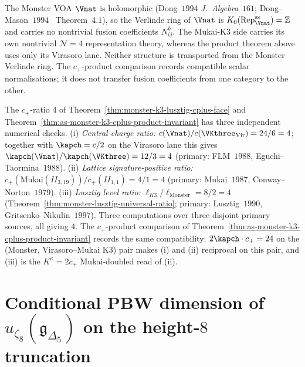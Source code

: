 \begin{remark}[Verlinde-style check: Monster fusion collapse forces
the Mukai $c_+ = 4$ side to carry the fusion content]
\label{rem:as-verlinde-monster-collapse}
%
%
The Monster VOA $\Vnat$ is holomorphic (Dong~$1994$
\emph{J.\ Algebra}~$161$; Dong--Mason~$1994$~\cite{DongMason94}
Theorem~$4.1$), so the Verlinde ring of $\Vnat$ is
$K_0(\mathrm{Rep}_{\Vnat}^{\mathrm{ss}}) = \mathbb Z$ and carries
no nontrivial fusion coefficients $N^k_{ij}$. The Mukai-K$3$ side
carries its own nontrivial $\mathcal N{=}4$ representation theory,
whereas the product theorem above uses only its Virasoro lane. Neither
structure is transported from the Monster Verlinde ring. The
$c_+$-product comparison records compatible scalar normalisations; it
does not transfer fusion coefficients from one category to the other.
\end{remark}

\begin{remark}
\label{rem:as-cplus-ratio-triverification}
%
The $c_+$-ratio $4$ of
Theorem~\ref{thm:monster-k3-lusztig-cplus-face} and
Theorem~\ref{thm:as-monster-k3-cplus-product-invariant} has three
independent numerical checks.
\textup{(i)} \emph{Central-charge ratio:}
$c(\Vnat)/c(\VKthree_{\mathrm{Vir}}) = 24/6 = 4$; together with
$\kapch = c/2$ on the Virasoro lane
this gives $\kapch(\Vnat)/\kapch(\VKthree) = 12/3 = 4$
(primary: FLM~$1988$, Eguchi--Taormina~$1988$).
\textup{(ii)} \emph{Lattice signature-positive ratio:}
$c_+(\mathrm{Mukai}(II_{3, 19}))/c_+(II_{1, 1}) = 4/1 = 4$
(primary: Mukai~$1987$, Conway--Norton~$1979$).
\textup{(iii)} \emph{Lusztig level ratio:}
$\ell_{K3}/\ell_{\mathrm{Monster}} = 8/2 = 4$
(Theorem~\ref{thm:monster-lusztig-universal-ratio}; primary:
Lusztig~$1990$, Gritsenko--Nikulin~$1997$). Three computations
over three disjoint primary sources, all giving $4$. The
$c_+$-product comparison of
Theorem~\ref{thm:as-monster-k3-cplus-product-invariant} records the
same compatibility:
$2 \kapch \cdot c_+ = 24$ on the (Monster, Virasoro--Mukai K$3$) pair
makes \textup{(i)} and \textup{(ii)} reciprocal
on this pair, and \textup{(iii)} is the
$K^\kappa = 2 c_+$ Mukai-doubled read of \textup{(ii)}.
\end{remark}

\section{Conditional PBW dimension of $u_{\zeta_8}(\mathfrak g_{\Delta_5})$
on the height-$8$ truncation}
\label{sec:exact-pbw-u-zeta-8}

